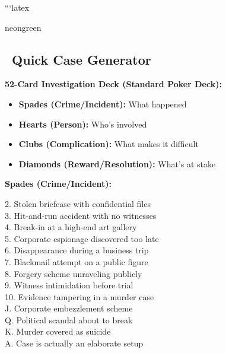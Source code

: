 \documentclass[11pt]{article}
\begin{document}
```latex
\newpage

\begin{noirsection}{neongreen}
\subsection*{\faCards\ Quick Case Generator}

\textbf{52-Card Investigation Deck (Standard Poker Deck):}
\begin{itemize}
    \item \textbf{Spades (Crime/Incident):} What happened
    \item \textbf{Hearts (Person):} Who's involved
    \item \textbf{Clubs (Complication):} What makes it difficult
    \item \textbf{Diamonds (Reward/Resolution):} What's at stake
\end{itemize}

\textbf{Spades (Crime/Incident):}
\begin{small}
\begin{multicols}{2}
2. Stolen briefcase with confidential files\\
3. Hit-and-run accident with no witnesses\\
4. Break-in at a high-end art gallery\\
5. Corporate espionage discovered too late\\
6. Disappearance during a business trip\\
7. Blackmail attempt on a public figure\\
8. Forgery scheme unraveling publicly\\
9. Witness intimidation before trial\\
10. Evidence tampering in a murder case\\
J. Corporate embezzlement scheme\\
Q. Political scandal about to break\\
K. Murder covered as suicide\\
A. Case is actually an elaborate setup
\end{multicols}
\end{small}


\end{noirsection}
\end{document}
